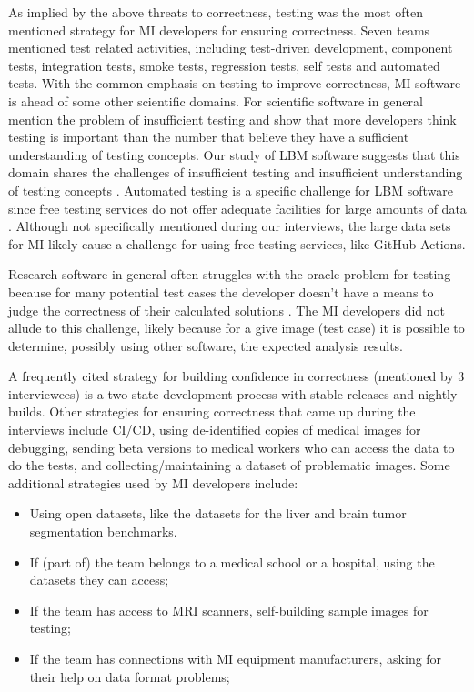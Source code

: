 \documentclass[final, 3p, times, authoryear]{elsarticle}
\begin{document}
\begin{enumerate}
As implied by the above threats to correctness, testing was the most often
mentioned strategy for MI developers for ensuring correctness.  Seven teams
mentioned test related activities, including test-driven development, component
tests, integration tests, smoke tests, regression tests, self tests and
automated tests.  With the common emphasis on testing to improve correctness, MI
software is ahead of some other scientific domains.  For scientific software in
general \citet{PintoEtAl2018} mention the problem of insufficient testing and
\citet{HannayEtAl2009} show that more developers think testing is important than
the number that believe they have a sufficient understanding of testing
concepts.  Our study of LBM software suggests that this domain shares the
challenges of insufficient testing and insufficient understanding of testing
concepts \citep{SmithEtAl2022}. Automated testing is a specific challenge for
LBM software since free testing services do not offer adequate facilities for
large amounts of data \citep{SmithEtAl2022}. Although not specifically mentioned
during our interviews, the large data sets for MI likely cause a challenge for
using free testing services, like GitHub Actions.

Research software in general often struggles with the oracle problem for testing
because for many potential test cases the developer doesn't have a means to
judge the correctness of their calculated solutions \citep{HannayEtAl2009,
KanewalaAndBieman2013, KellyEtAl2011, WieseEtAl2019}.  The MI developers did not
allude to this challenge, likely because for a give image (test case) it is
possible to determine, possibly using other software, the expected analysis
results.

A frequently cited strategy for building confidence in correctness (mentioned by
3 interviewees) is a two state development process with stable releases and
nightly builds.  Other strategies for ensuring correctness that came up during
the interviews include CI/CD, using de-identified copies of medical images for
debugging, sending beta versions to medical workers who can access the data to
do the tests, and collecting/maintaining a dataset of problematic images.  Some
additional strategies used by MI developers include:

\begin{itemize}
\item Using open datasets, like the datasets for the liver \citep{BilicEtAl2019}
and brain \citep{MenzeEtAl2015} tumor segmentation benchmarks.
\item If (part of) the team belongs to a medical school or a hospital, using the
datasets they can access;
\item If the team has access to MRI scanners, self-building sample images for
testing;
\item If the team has connections with MI equipment manufacturers, asking for
their help on data format problems;
\end{itemize}


\end{enumerate}
\end{document}
